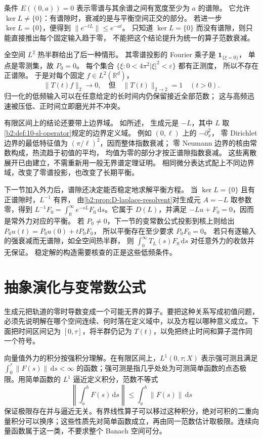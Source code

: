 条件 \(E((0,a))=0\) 表示零谱与其余谱之间有宽度至少为 \(a\) 的谱隙。
它允许 \(\ker L\ne\{0\}\)：有谱隙时，衰减的是与平衡空间正交的部分。
若进一步 \(\ker L=\{0\}\)，便得到
\(\|e^{-tL}\|\le e^{-at}\)。
只知道 \(\ker L=\{0\}\) 而没有谱隙，则只能直接推出每个固定输入趋于零，
不能把这个结论提升为统一的算子范数衰减。

\ProseParagraphBreak
全空间 \(L^2\) 热半群给出了后一种情形。
其零谱投影的 Fourier 乘子是 \(\mathbf1_{\{\xi=0\}}\)，
单点是零测集，故 \(P_0=0\)。
每个集合 \(\{\xi:0<4\pi^2|\xi|^2<\varepsilon\}\) 都有正测度，
所以不存在正谱隙。
于是对每个固定 \(f\in L^2(\mathbb R^d)\)，
\[
 \|T(t)f\|_2\longrightarrow0,
 \quad\text{但}\quad \|T(t)\|_{2\to2}=1\quad(t>0).
\]
归一化的低频输入可以在任意给定的长时间内仍保留接近全部范数；
这与高频迅速被压低、正时间立即磨光并不冲突。

有限区间上的结论还要带上边界域。
如所述，
生成元是 \(-L\)，其中 \(L\) 取\cref{b2:def:10-sl-operator}规定的边界定义域。
例如 \((0,\ell)\) 上的 \(-\partial_x^2\)，
零 Dirichlet 边界的最低特征值为 \((\pi/\ell)^2\)，因而整体指数衰减；
零 Neumann 边界的核由常数构成，热流趋于初值的平均，
均值为零的部分才按正谱隙指数衰减。
这些离散展开已由建立，不需重新用一般无界谱定理证明。
相同微分表达式配上不同边界域，改变了零谱投影，也改变了长期平衡。

\ProseParagraphBreak
下一节加入外力后，谱隙还决定能否稳定地求解平衡方程。
当 \(\ker L=\{0\}\) 且有正谱隙时，\(L^{-1}\) 有界，
由\cref{b2:prop:D-laplace-resolvent}对生成元 \(A=-L\) 取参数零，得到
\(L^{-1}F_0=\int_0^\infty e^{-sL}F_0\,\mathrm ds\)。它属于 \(D(L)\)，并满足 \(-Lu+F_0=0\)，因而是常外力对应的平衡。
若 \(P_0\ne0\)，下一节的变常数公式投影到核上则给出
\(P_0u(t)=P_0u(0)+tP_0F_0\)，
所以平衡存在至少要求 \(P_0F_0=0\)。
若只有逐输入的强衰减而无谱隙，如全空间热半群，
则 \(\int_0^\infty T_L(s)F_0\,\mathrm ds\) 对任意外力的收敛并无保证。
稳定解的构造需要核查的正是这些低频条件。

\section{抽象演化与变常数公式}
\label{b2:sec:app-D-5}

生成元把轨道的零时导数变成一个可能无界的算子。要把这种关系写成初值问题，必须先说明解在哪个空间连续、何时落在定义域中，以及方程以哪种意义成立。下面把时间区间记为 \([0,\tau]\)，将半群仍记为 \(T(t)\)，以免把终止时间和算子混作同一个符号。

\ProseParagraphBreak

向量值外力的积分按强积分理解。在有限区间上，\(L^1(0,\tau;X)\) 表示强可测且满足 \(\int_0^\tau\|F(s)\|\,\mathrm ds<\infty\) 的函数；强可测是指几乎处处为可测简单函数的点态极限。用简单函数的 \(L^1\) 逼近定义积分，范数不等式
\[
 \left\|\int_a^bF(s)\,\mathrm ds\right\|
 \leq\int_a^b\|F(s)\|\,\mathrm ds
\]
保证极限存在并与逼近无关。有界线性算子可以移过这种积分，绝对可积的二重向量积分可以换序；这些性质先对简单函数成立，再由同一范数估计取极限。连续向量函数属于这一类，不要求整个 Banach 空间可分。

